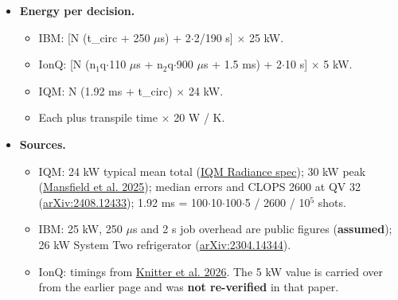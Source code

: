 \begin{itemize}
\begin{itemize}
    \item IonQ (calibrated): a = --0.152, $\varepsilon_{2}$ = 5.37 $\times$ 10$^{-3}$ (± 0.49 $\times$ 10$^{-3}$) per two-qubit gate, with the one-qubit term kept at the spec ratio ($\varepsilon_{1}$ = 0.05 $\varepsilon_{2}$). Fitted on the same 27 post-selected models run on IonQ's cloud simulator with its noise model \texttt{forte-1} (100 std pairs, 4096 shots, CU readout; \texttt{analysis/bench/ionq\_calib.py}, \texttt{calib\_fit.py}) against IonQ-native counts (r$^{2}$ = 0.83). This replaces the earlier spec values ($\varepsilon_{2}$ = 4 $\times$ 10$^{-3}$, $\varepsilon_{1}$ = 2 $\times$ 10$^{-4}$, \textbf{assumed}).
    \item IQM (calibrated): a = --0.384, $\varepsilon$ = 7.06 $\times$ 10$^{-3}$ (± 0.66 $\times$ 10$^{-3}$) per routed CZ, from the same 27 post-selected models emulated with the iqm-client fake Garnet noise model (density matrix, 300 std pairs, 2$^{20}$ shots, CU readout; \texttt{shotcost\_noise.py --profiles iqm\_garnet}) against their best-of-5 routed CZ counts on the IQM lattice (r$^{2}$ = 0.82). It replaces the earlier model (Kingston's fit scaled by the median-error ratios, $\varepsilon$ = 1.02 $\times$ 10$^{-2}$).
    \item All three backends are calibrated the same way on the same 27 post-selected models; each fit is bootstrapped over its own runs in the uncertainty bands.
  \end{itemize}
  \item \textbf{Energy per decision.}
  \begin{itemize}
    \item IBM: [N (t\_circ + 250 $\mu$s) + 2$\cdot$2/190 s] $\times$ 25 kW.
    \item IonQ: [N (n$_{1}$q$\cdot$110 $\mu$s + n$_{2}$q$\cdot$900 $\mu$s + 1.5 ms) + 2$\cdot$10 s] $\times$ 5 kW.
    \item IQM: N (1.92 ms + t\_circ) $\times$ 24 kW.
    \item Each plus transpile time $\times$ 20 W / K.
  \end{itemize}
  \item \textbf{Sources.}
  \begin{itemize}
    \item IQM: 24 kW typical mean total (\href{https://iqm.tech/products/iqm-radiance/}{IQM Radiance spec}); 30 kW peak (\href{https://arxiv.org/abs/2509.12949}{Mansfield et al. 2025}); median errors and CLOPS 2600 at QV 32 (\href{https://arxiv.org/abs/2408.12433}{arXiv:2408.12433}); 1.92 ms = 100$\cdot$10$\cdot$100$\cdot$5 / 2600 / 10$^{5}$ shots.
    \item IBM: 25 kW, 250 $\mu$s and 2 s job overhead are public figures (\textbf{assumed}); 26 kW System Two refrigerator (\href{https://arxiv.org/abs/2304.14344}{arXiv:2304.14344}).
    \item IonQ: timings from \href{https://arxiv.org/abs/2605.02798}{Knitter et al. 2026}. The 5 kW value is carried over from the earlier page and was \textbf{not re-verified} in that paper.

  \end{itemize}
\end{itemize}
